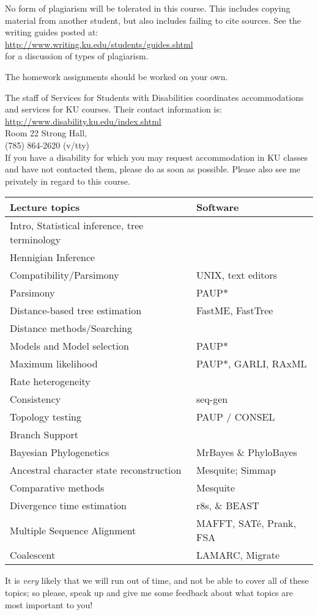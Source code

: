 \documentclass[11pt]{article}
\begin{document}
\vskip 2mm
\par
No form of plagiarism will be tolerated in this course.
This includes copying material from another student, but also includes failing to cite sources.
See the writing guides posted at:\\
\url{http://www.writing.ku.edu/students/guides.shtml}\\
for a discussion of types of plagiarism. 

The homework assignments should be worked on your own. 

\newpage
{}\par
The staff of Services for Students with Disabilities coordinates accommodations and services for KU courses. Their contact information is:\\ 
\url{http://www.disability.ku.edu/index.shtml}\\
Room 22 Strong Hall,  \\
(785) 864-2620 (v/tty) \\ 
If you have a disability for which you may request accommodation in KU classes and have not contacted them, please do as soon as possible. 
Please also see me privately in regard to this course. 
 
\begin{table}[h]
\begin{center}
\begin{tabular}{|l|p{1.9in}|}
\hline
 {\bf Lecture topics} & {\bf Software} \\
\hline
Intro,  Statistical inference, tree terminology & \\
\hline
Hennigian Inference & \\
\hline
Compatibility/Parsimony & UNIX, text editors \\
\hline
Parsimony & PAUP$\ast$\\
\hline
Distance-based tree estimation & FastME, FastTree \\
\hline
Distance methods/Searching & \\
\hline
Models and Model selection & PAUP$\ast$\\
\hline
Maximum likelihood & PAUP$\ast$, GARLI, RAxML \\
\hline
Rate heterogeneity & \\
\hline 
Consistency & seq-gen \\
\hline
Topology testing & PAUP / CONSEL \\
\hline
Branch Support &  \\
\hline
Bayesian Phylogenetics & MrBayes \& PhyloBayes \\
\hline
 Ancestral character state reconstruction & Mesquite; Simmap \\
\hline
Comparative methods & Mesquite \\
\hline
Divergence time estimation & r8s, \& BEAST \\
\hline
Multiple Sequence Alignment & MAFFT, SAT\'e, Prank, FSA\\
\hline
Coalescent & LAMARC, Migrate\\
\hline
\end{tabular}
\end{center}
\label{default}
\end{table}%

It is {\em very} likely that we will run out of time, and not be able to cover all of these topics; so please, speak up and give me some feedback about what topics are most important to you!
\end{document}
